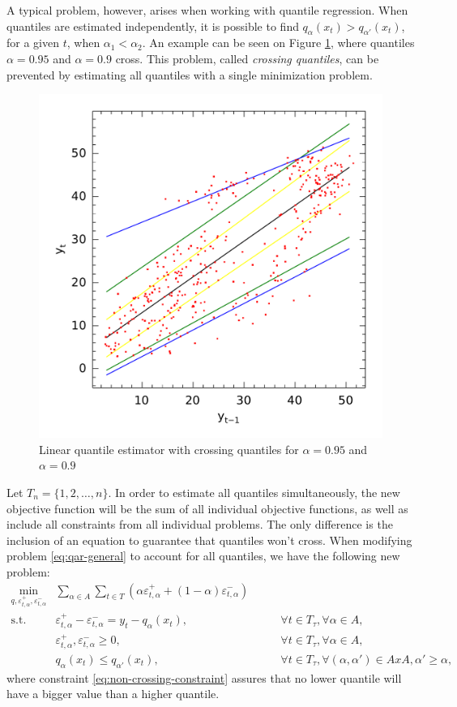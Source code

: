 A typical problem, however, arises when working with quantile regression. When quantiles are estimated independently, it is possible to find $q_{\alpha}(x_t) > q_{\alpha'}(x_t)$, for a given $t$, when $\alpha_1 < \alpha_2$. An example can be seen on Figure \ref{fig:crossing-quantiles}, where quantiles $\alpha = 0.95$ and $\alpha = 0.9$ cross. This problem, called \textit{crossing quantiles}, can be prevented by estimating all quantiles with a single minimization problem.
\begin{figure}
	\centering
	\includegraphics[width=0.6\linewidth]{./Figuras/npqar/icaraizinho-crossing-200}
	\caption{Linear quantile estimator with crossing quantiles for $\alpha = 0.95$ and $\alpha = 0.9$}
	\label{fig:crossing-quantiles}
\end{figure}

 Let $T_n = \{1, 2, \dots, n\}$. In order to estimate all quantiles simultaneously, the new objective function will be the sum of all individual objective functions, as well as include all constraints from all individual problems. The only difference is the inclusion of an equation to guarantee that quantiles won't cross. When modifying problem \ref{eq:qar-general} to account for all quantiles, we have the following new problem:
\begin{eqnarray}
\label{eq:non-crossing-quantiles1}
\min_{q,\varepsilon_{t,\alpha}^{+}, \varepsilon_{t,\alpha}^{-}} &  \sum_{\alpha \in A} \sum_{t \in T}\left(\alpha \varepsilon_{t,\alpha}^{+}+(1-\alpha)\varepsilon_{t,\alpha}^{-}\right) &  \\
\mbox{s.t. } & \varepsilon_{t,\alpha}^{+}-\varepsilon_{t,\alpha}^{-}=y_{t}-q_\alpha(x_{t}), & \qquad\forall t \in T_\tau,\forall \alpha \in A,\\
& \varepsilon_{t,\alpha}^+,\varepsilon_{t,\alpha}^- \geq 0, & \qquad\forall t \in T_\tau,\forall \alpha \in A,\\\label{eq:non-crossing-constraint}
& q_{\alpha}(x_t) \leq q_{\alpha'}(x_t), & \qquad \forall t \in T_\tau, \forall (\alpha, \alpha') \in AxA,  \alpha' \geq \alpha, 
\end{eqnarray}
where constraint \ref{eq:non-crossing-constraint} assures that no lower quantile will have a bigger value than a higher quantile. 




